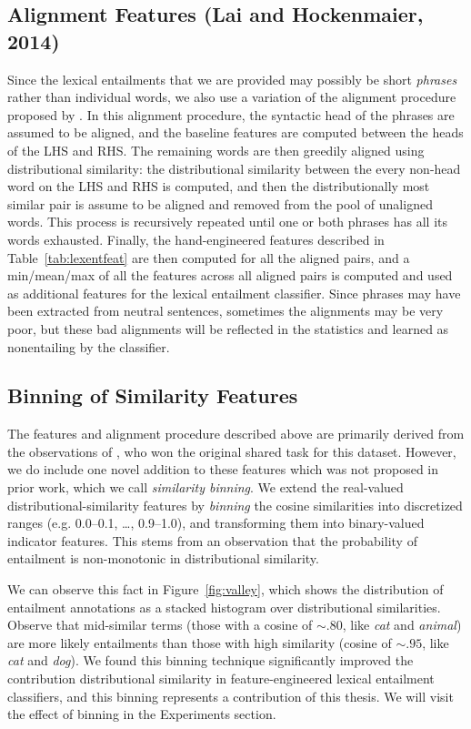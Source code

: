 \subsection{Alignment Features (Lai and Hockenmaier, 2014)}
\label{sec:alignment}

Since the lexical entailments that we are provided may possibly be short
{\em phrases} rather than individual words, we also use a variation of the
alignment procedure proposed by . In this alignment
procedure, the syntactic head of the phrases are assumed to be aligned, and
the baseline features are computed between the heads of the LHS and RHS.
The remaining words are then greedily aligned using distributional similarity:
the distributional similarity between the every non-head word on the LHS and
RHS is computed, and then the distributionally most similar pair is assume to
be aligned and removed from the pool of unaligned words. This process is
recursively repeated until one or both phrases has all its words exhausted.
Finally, the hand-engineered features described in Table~\ref{tab:lexentfeat}
are then computed for all the aligned pairs, and a min/mean/max of all the
features across all aligned pairs is computed and used as additional features
for the lexical entailment classifier. Since phrases may have been extracted
from neutral sentences, sometimes the alignments may be very poor, but these
bad alignments will be reflected in the statistics and learned as nonentailing
by the classifier.

\subsection{Binning of Similarity Features}

The features and alignment procedure described above are primarily derived
from the observations of \cite{lai:2014:semeval}, who won the original shared
task for this dataset. However, we do include one novel addition to
these features which was not proposed in prior work, which we call
{\em similarity binning}. We extend the real-valued distributional-similarity
features by {\em binning} the cosine similarities into discretized ranges
(e.g. 0.0--0.1, \ldots, 0.9--1.0), and transforming them into binary-valued
indicator features. This stems from an observation that the probability of
entailment is non-monotonic in distributional similarity.

We can observe this fact in Figure~\ref{fig:valley}, which shows the
distribution of entailment annotations as a stacked histogram over
distributional similarities. Observe that
mid-similar terms (those with a cosine of $\sim.80$, like {\em cat} and {\em
animal}) are more likely entailments than those with high similarity
(cosine of $\sim.95$, like {\em cat} and {\em dog}). We found this binning
technique significantly improved the contribution distributional similarity
in feature-engineered lexical entailment classifiers, and this binning
represents a contribution of this thesis. We will visit the effect of binning
in the Experiments section.

